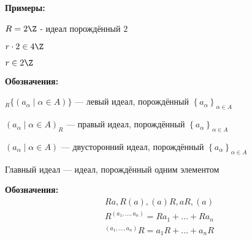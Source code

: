 \textbf{Примеры:}

$R = 2\Z$ - идеал порождённый $2$

$r \cdot 2 \in 4 \Z$

$r \in 2\Z$

\textbf{Обозначения:}

${}_R \{(a_\alpha \mid \alpha \in A)\}$ --- левый идеал, порождённый $\left\lbrace a_\alpha \right\rbrace_{\alpha \in A}$

$(a_\alpha \mid \alpha \in A)_R$ --- правый идеал, порождённый $\left\lbrace a_\alpha \right\rbrace_{\alpha \in A}$

$(a_\alpha \mid \alpha \in A)$ --- двусторонний идеал, порождённый $\left\lbrace a_\alpha \right\rbrace_{\alpha \in A}$

\begin{Def}
	Главный идеал --- идеал, порождённый одним элементом
	
\textbf{Обозначения:} 
	\begin{gather*}
		Ra, R(a), (a)R, aR, (a) \\
		R^{(a_1, \dots, a_n)} = Ra_1 + \dots + Ra_n \\
		{}^{(a_1, \dots, a_n)}R = a_1R + \dots + a_nR
	\end{gather*}
\end{Def}

